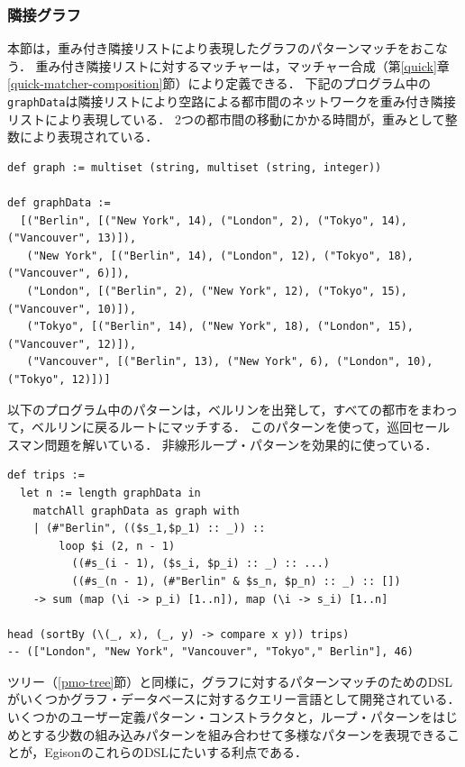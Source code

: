 \subsubsection{隣接グラフ}

本節は，重み付き隣接リストにより表現したグラフのパターンマッチをおこなう．
重み付き隣接リストに対するマッチャーは，マッチャー合成（第\ref{quick}章\ref{quick-matcher-composition}節）により定義できる．
下記のプログラム中の\lstinline{graphData}は隣接リストにより空路による都市間のネットワークを重み付き隣接リストにより表現している．
2つの都市間の移動にかかる時間が，重みとして整数により表現されている．
\begin{lstlisting}[language=egison,numbers=none]
def graph := multiset (string, multiset (string, integer))

def graphData :=
  [("Berlin", [("New York", 14), ("London", 2), ("Tokyo", 14), ("Vancouver", 13)]),
   ("New York", [("Berlin", 14), ("London", 12), ("Tokyo", 18), ("Vancouver", 6)]),
   ("London", [("Berlin", 2), ("New York", 12), ("Tokyo", 15), ("Vancouver", 10)]),
   ("Tokyo", [("Berlin", 14), ("New York", 18), ("London", 15), ("Vancouver", 12)]),
   ("Vancouver", [("Berlin", 13), ("New York", 6), ("London", 10), ("Tokyo", 12)])]
\end{lstlisting}
以下のプログラム中のパターンは，ベルリンを出発して，すべての都市をまわって，ベルリンに戻るルートにマッチする．
このパターンを使って，巡回セールスマン問題を解いている．
非線形ループ・パターンを効果的に使っている．
\begin{lstlisting}[language=egison,numbers=none]
def trips :=
  let n := length graphData in
    matchAll graphData as graph with
    | (#"Berlin", (($s_1,$p_1) :: _)) ::
        loop $i (2, n - 1)
          ((#s_(i - 1), ($s_i, $p_i) :: _) :: ...)
          ((#s_(n - 1), (#"Berlin" & $s_n, $p_n) :: _) :: [])
    -> sum (map (\i -> p_i) [1..n]), map (\i -> s_i) [1..n]

head (sortBy (\(_, x), (_, y) -> compare x y)) trips)
-- (["London", "New York", "Vancouver", "Tokyo"," Berlin"], 46)
\end{lstlisting}

ツリー（\ref{pmo-tree}節）と同様に，グラフに対するパターンマッチのためのDSLがいくつかグラフ・データベースに対するクエリー言語として開発されている．
いくつかのユーザー定義パターン・コンストラクタと，ループ・パターンをはじめとする少数の組み込みパターンを組み合わせて多様なパターンを表現できることが，EgisonのこれらのDSLにたいする利点である．
